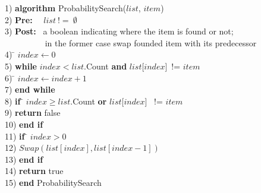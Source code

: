 \begin{tabbing}
1) \textbf{alg}\= \textbf{orithm} ProbabilitySearch($list$, $item$)\\
2) \> \textbf{Pre:}~~ $list~!=~\emptyset$ \\
3) \> \textbf{Post:}~ a boolean indicating where the item is found or not;\\
   \>~~~~~~~~~ in the former case swap founded item with its predecessor \\
4) \> \= $index \leftarrow 0$ \\
5) \> \textbf{whi}\= \textbf{le} $index < list$.Count  \textbf{and} $list$[$index$]~!= $item$ \\
6) \> \> \= $index \leftarrow index+1$ \\
7) \> \textbf{end while} \\
8) \> \textbf{if }\= $ index \geq list$.Count  \textbf{or} $list$[$index$] ~!= $item$ \\
9) \> \> \textbf{return} false \\
10)\> \textbf{end if} \\
11)\> \textbf{if }\= $ index > 0$ \\
12)\> \> $Swap(list[index], list[index-1])$ \\
13)\> \textbf{end if } \\
14)\> \textbf{return} true \\ 
15) \textbf{end} ProbabilitySearch \\
\end {tabbing}
